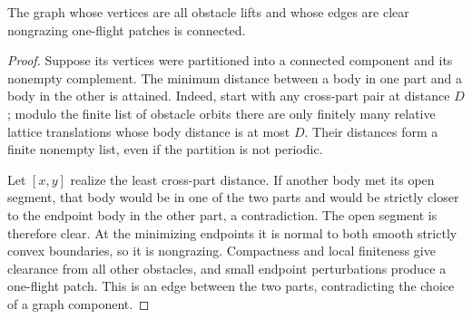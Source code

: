 \begin{lemma}
\label{lem:v77-visible-connected}
The graph whose vertices are all obstacle lifts and whose edges are
clear nongrazing one-flight patches is connected.
\end{lemma}
\begin{proof}
Suppose its vertices were partitioned into a connected component and
its nonempty complement.  The minimum distance between a body in one
part and a body in the other is attained.  Indeed, start with any
cross-part pair at distance $D$; modulo the finite list of obstacle
orbits there are only finitely many relative lattice translations whose
body distance is at most $D$.  Their distances form a finite nonempty
list, even if the partition is not periodic.

Let $[x,y]$ realize the least cross-part distance.  If another body
met its open segment, that body would be in one of the two parts and
would be strictly closer to the endpoint body in the other part,
a contradiction.  The open segment is therefore clear.  At the
minimizing endpoints it is normal to both smooth strictly convex
boundaries, so it is nongrazing.  Compactness and local finiteness give
clearance from all other obstacles, and small endpoint perturbations
produce a one-flight patch.  This is an edge between the two parts,
contradicting the choice of a graph component.
\end{proof}

